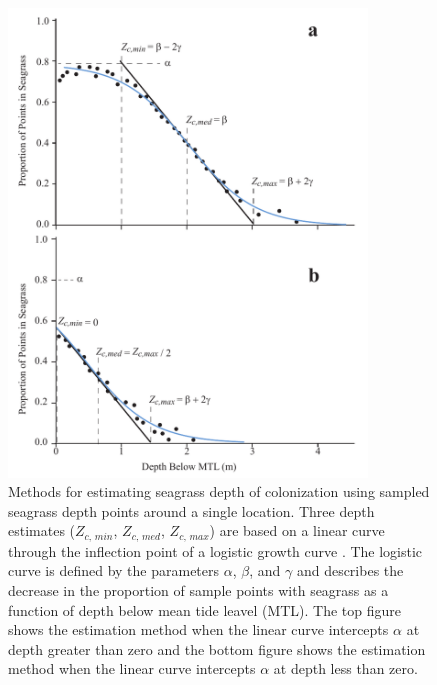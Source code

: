 \documentclass[letterpaper,12pt,oneside]{article}\usepackage[]{graphicx}\usepackage[]{color}
\begin{document}
\begin{figure}
\centering
\includegraphics[width=0.85\textwidth]{figs/Fig3.pdf}
\caption{Methods for estimating seagrass depth of colonization using sampled seagrass depth points around a single location. Three depth estimates ($Z_{c,\,min}$, $Z_{c,\,med}$, $Z_{c,\,max}$) are based on a linear curve through the inflection point of a logistic growth curve .  The logistic curve is defined by the parameters $\alpha$, $\beta$, and $\gamma$ and describes the decrease in the proportion of sample points with seagrass as a function of depth below mean tide leavel (MTL).  The top figure shows the estimation method when the linear curve intercepts $\alpha$ at depth greater than zero and the bottom figure shows the estimation method when the linear curve intercepts $\alpha$ at depth less than zero.}
\label{fig:est_ex}
\end{figure}

\end{document}
